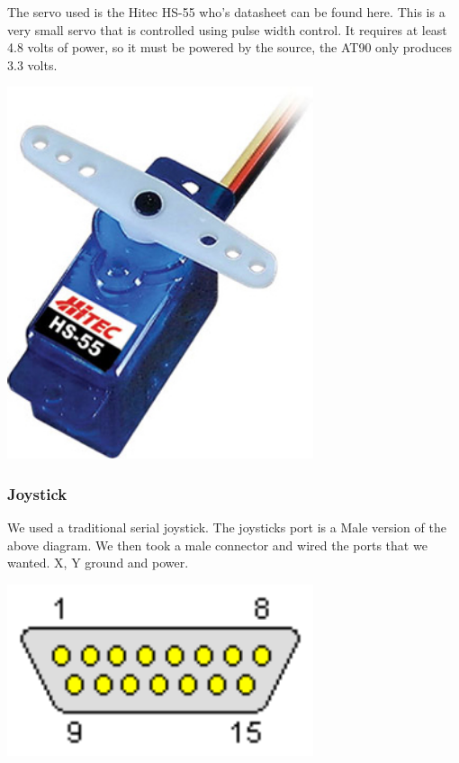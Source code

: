 The servo used is the Hitec HS-55 who's datasheet can be found here. This is a very small servo that is controlled using pulse width control. It requires at least 4.8 volts of power, so it must be powered by the source, the AT90 only produces 3.3 volts.


  \begin{minipage}{6.5in}
    \includegraphics[width=90mm]{imageSources/servo.png}
  \centering
  \label{servo}
\end{minipage}


\subsubsection{Joystick}
We used a traditional serial joystick. The joysticks port is a Male version of the above diagram. We then took a male connector and wired the ports that we wanted. X, Y ground and power. 


  \begin{minipage}{6.5in}
    \includegraphics[width=90mm]{imageSources/joystick.png}
  \label{joystick}
\end{minipage}


